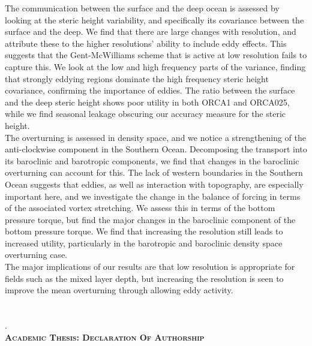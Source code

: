 \documentclass[a4paper,12pt, openright, titlepage]{book}
\begin{document}
The communication between the surface and the deep ocean is assessed by looking at the steric height variability, and specifically its covariance between the surface and the deep. We find that there are large changes with resolution, and attribute these to the higher resolutions' ability to include eddy effects. This suggests that the Gent-McWilliams scheme that is active at low resolution fails to capture this. We look at the low and high frequency parts of the variance, finding that strongly eddying regions dominate the high frequency steric height covariance, confirming the importance of eddies. The ratio between the surface and the deep steric height shows poor utility in both ORCA1 and ORCA025, while we find seasonal leakage obscuring our accuracy measure for the steric height.\\

The overturning is assessed in density space, and we notice a strengthening of the anti-clockwise component in the Southern Ocean. Decomposing the transport into its baroclinic and barotropic components, we find that changes in the baroclinic overturning can account for this. The lack of western boundaries in the Southern Ocean suggests that eddies, as well as interaction with topography, are especially important here, and we investigate the change in the balance of forcing in terms of the associated vortex stretching. We assess this in terms of the bottom pressure torque, but find the major changes in the baroclinic component of the bottom pressure torque. We find that increasing the resolution still leads to increased utility, particularly in the barotropic and baroclinic density space overturning case.\\

The major implications of our results are that low resolution is appropriate for fields such as the mixed layer depth, but increasing the resolution is seen to improve the mean overturning through allowing eddy activity.\\ 


\clearpage
\tableofcontents
\clearpage
\listoftables
\listoffigures

\clearpage
\chapter[Declaration of authorship]{ }
. \\[-6.51cm]
\textbf{\textsc{\Large Academic Thesis: Declaration Of Authorship}}\\[0.5cm]
\end{document}
